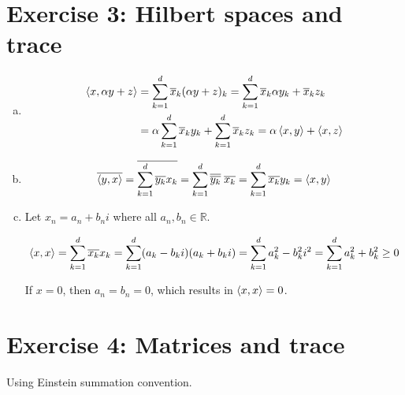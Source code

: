 \documentclass[a4paper,german,12pt,smallheadings]{scrartcl}
\begin{document}
\section*{Exercise 3: Hilbert spaces and trace}
\begin{enumerate}[a)]
  \item
    \begin{align*}
      \braket{x, \alpha y + z} &=
      \sum_{k=1}^d \overline{x}_k (\alpha y + z)_k =
      \sum_{k=1}^d \overline{x}_k \alpha y_k + \overline{x}_k z_k \\
      &= \alpha \sum_{k=1}^d \overline{x}_k y_k + \sum_{k=1}^d \overline{x}_k z_k =
      \alpha \braket{x,y} + \braket{x,z}
    \end{align*}
  \item
    \begin{equation*}
      \overline{\braket{y,x}} =
      \overline{\sum_{k=1}^d \overline{y_k} x_k} =
      \sum_{k=1}^d \overline{\overline{y_k}}\; \overline{x_k} =
      \sum_{k=1}^d \overline{x_k} y_k =
      \braket{x,y}
    \end{equation*}
  \item
    Let $x_n = a_n+b_ni$ where all $a_n,b_n \in \mathbb{R}$.

    \begin{equation*}
      \braket{x,x} =
      \sum_{k=1}^d \overline{x_k} x_k =
      \sum_{k=1}^d (a_k-b_ki)(a_k+b_ki) =
      \sum_{k=1}^d a_k^2 - b_k^2i^2 =
      \sum_{k=1}^d a_k^2 + b_k^2 \ge 0
    \end{equation*}

    If $x = 0$, then $a_n = b_n = 0$, which results in $\braket{x, x} = 0$.
\end{enumerate}

\section*{Exercise 4: Matrices and trace}
Using Einstein summation convention.
\end{document}
